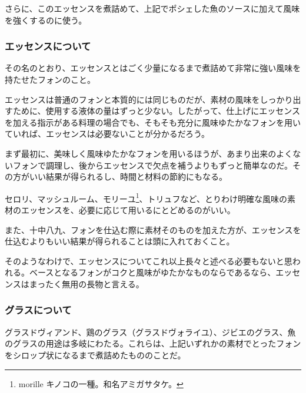 \begin{recette}
さらに、このエッセンスを煮詰めて、上記でポシェした魚のソースに加えて風味を強くするのに使う。

\atoaki{}

\hypertarget{essences-diverses}{%
\subsubsection{エッセンスについて}\label{essences-diverses}}



その名のとおり、エッセンスとはごく少量になるまで煮詰めて非常に強い風味を持たせたフォンのこと。

エッセンスは普通のフォンと本質的には同じものだが、素材の風味をしっかり出すために、使用する液体の量はずっと少ない。したがって、仕上げにエッセンスを加える指示がある料理の場合でも、そもそも充分に風味ゆたかなフォンを用いていれば、エッセンスは必要ないことが分かるだろう。

まず最初に、美味しく風味ゆたかなフォンを用いるほうが、あまり出来のよくないフォンで調理し、後からエッセンスで欠点を補うよりもずっと簡単なのだ。その方がいい結果が得られるし、時間と材料の節約にもなる。

セロリ、マッシュルーム、モリーユ\footnote{morille
  キノコの一種。和名アミガサタケ。}、トリュフなど、とりわけ明確な風味の素材のエッセンスを、必要に応じて用いるにとどめるのがいい。

また、十中八九、フォンを仕込む際に素材そのものを加えた方が、エッセンスを仕込むよりもいい結果が得られることは頭に入れておくこと。

そのようなわけで、エッセンスについてこれ以上長々と述べる必要もないと思われる。ベースとなるフォンがコクと風味がゆたかなものならであるなら、エッセンスはまったく無用の長物と言える。

\atoaki{}

\hypertarget{glaces-diverses}{%
\subsubsection{グラスについて}\label{glaces-diverses}}



グラスドヴィアンド、鶏のグラス（グラスドヴォライユ）、ジビエのグラス、魚のグラスの用途は多岐にわたる。これらは、上記いずれかの素材でとったフォンをシロップ状になるまで煮詰めたもののことだ。


\end{recette}
